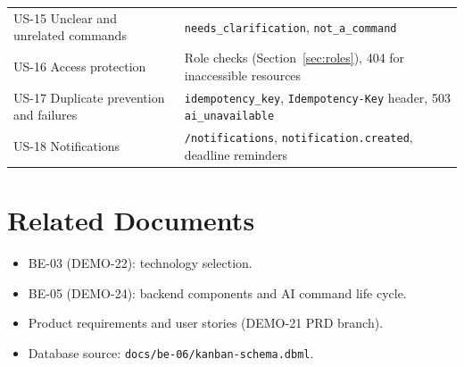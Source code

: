 \documentclass[11pt,a4paper]{article}
\newcommand{\code}[1]{\texttt{#1}}
\begin{document}
{\begin{xltabular}{\textwidth}{P{4.4cm} L}
US-15 Unclear and unrelated commands & \code{needs\_clarification}, \code{not\_a\_command} \\
US-16 Access protection & Role checks (Section~\ref{sec:roles}), 404 for inaccessible resources \\
US-17 Duplicate prevention and failures & \code{idempotency\_key}, \code{Idempotency-Key} header, 503 \code{ai\_unavailable} \\
US-18 Notifications & \code{/notifications}, \code{notification.created}, deadline reminders \\
\bottomrule
\end{xltabular}}

\section{Related Documents}

\begin{itemize}
  \item BE-03 (DEMO-22): technology selection.
  \item BE-05 (DEMO-24): backend components and AI command life cycle.
  \item Product requirements and user stories (DEMO-21 PRD branch).
  \item Database source: \code{docs/be-06/kanban-schema.dbml}.
\end{itemize}
\end{document}
